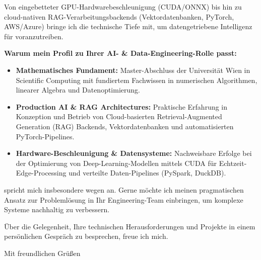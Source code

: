 \documentclass[11pt,a4paper]{article}
\begin{document}
Von eingebetteter GPU-Hardwarebeschleunigung (CUDA/ONNX) bis hin zu cloud-nativen RAG-Verarbeitungsbackends (Vektordatenbanken, PyTorch, AWS/Azure) bringe ich die technische Tiefe mit, um datengetriebene Intelligenz für \textbf{\firmenName} voranzutreiben.

\textbf{Warum mein Profil zu Ihrer AI- & Data-Engineering-Rolle passt:}

\begin{itemize}[leftmargin=1.2em, itemsep=0.15em, parsep=0pt, topsep=0.2em]
    \item \textbf{Mathematisches Fundament:} Master-Abschluss der Universität Wien in Scientific Computing mit fundiertem Fachwissen in numerischen Algorithmen, linearer Algebra und Datenoptimierung.
    \item \textbf{Production AI \& RAG Architectures:} Praktische Erfahrung in Konzeption und Betrieb von Cloud-basierten Retrieval-Augmented Generation (RAG) Backends, Vektordatenbanken und automatisierten PyTorch-Pipelines.
    \item \textbf{Hardware-Beschleunigung \& Datensysteme:} Nachweisbare Erfolge bei der Optimierung von Deep-Learning-Modellen mittels CUDA für Echtzeit-Edge-Processing und verteilte Daten-Pipelines (PySpark, DuckDB).
\end{itemize}

\firmenFlussbezug spricht mich insbesondere wegen \textit{\firmenHighlight} an. Gerne möchte ich meinen pragmatischen Ansatz zur Problemlösung in Ihr Engineering-Team einbringen, um komplexe Systeme nachhaltig zu verbessern.

Über die Gelegenheit, Ihre technischen Herausforderungen und Projekte in einem persönlichen Gespräch zu besprechen, freue ich mich.

\vspace{0.6em}

Mit freundlichen Grüßen

\vspace{1.2em}

\textbf{\meinName}
\end{document}
